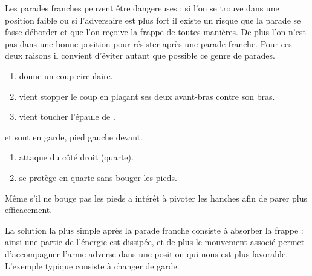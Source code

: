 Les parades franches peuvent être dangereuses : si l'on se trouve dans une position faible ou si l'adversaire est plus fort il existe un risque que la parade se fasse déborder et que l'on reçoive la frappe de toutes manières.
De plus l'on n'est pas dans une bonne position pour résister après une parade franche.
Pour ces deux raisons il convient d'éviter autant que possible ce genre de parades.


\begin{exercice}
	
	
	\begin{enumerate}
		\item \A donne un coup circulaire.
		
		\item \D vient stopper le coup en plaçant ses deux avant-bras contre son bras.
		
		\item \D vient toucher l'épaule de \A.
	\end{enumerate}
\end{exercice}


\begin{exercice}
	

	\A et \D sont en garde, pied gauche devant.

	\begin{enumerate}
		\item \A attaque \D du côté droit (quarte).
		
		\item \D se protège en quarte sans bouger les pieds.
	\end{enumerate}

	Même s'il ne bouge pas les pieds \D a intérêt à pivoter les hanches afin de parer plus efficacement.
\end{exercice}


La solution la plus simple après la parade franche consiste à absorber la frappe : ainsi une partie de l'énergie est dissipée, et de plus le mouvement associé permet d'accompagner l'arme adverse dans une position qui nous est plus favorable.
L'exemple typique consiste à changer de garde.


